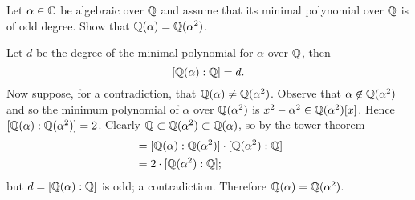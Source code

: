 \documentclass[a4paper, answers]{exam}
\begin{document}
\begin{questions}
	\question
		Let $\alpha \in \mathbb{C}$ be algebraic over $\mathbb{Q}$ and assume that its
		minimal polynomial over $\mathbb{Q}$ is of odd degree.
		Show that $\mathbb{Q}(\alpha) = \mathbb{Q}(\alpha^2)$.
		\begin{solution}
			Let $d$ be the degree of the minimal polynomial for $\alpha$ over
			$\mathbb{Q}$, then
			\[
				[\mathbb{Q}(\alpha): \mathbb{Q}] = d.
			\]
			Now suppose, for a contradiction, that 
			$\mathbb{Q}(\alpha) \neq \mathbb{Q}(\alpha^2)$.
			Observe that $\alpha \not\in \mathbb{Q}(\alpha^2)$ and so the minimum
			polynomial of $\alpha$ over $\mathbb{Q}(\alpha^2)$ is 
			$x^2 - \alpha^2 \in \mathbb{Q}(\alpha^2)[x]$.
			Hence $[\mathbb{Q}(\alpha): \mathbb{Q}(\alpha^2)] = 2$.
			Clearly $\mathbb{Q} \subset \mathbb{Q}(\alpha^2) \subset \mathbb{Q}(\alpha)$, so by the
			tower theorem
			\begin{align*}
				[\Q(\alpha): \Q]
					&= [\Q(\alpha): \Q(\alpha^2)] \cdot
					[\Q(\alpha^2): \Q] \\
					&= 2 \cdot [\Q(\alpha^2): \Q];
			\end{align*}
			but $d = [\mathbb{Q}(\alpha): \mathbb{Q}]$ is odd; a contradiction.
			Therefore $\mathbb{Q}(\alpha) = \mathbb{Q}(\alpha^2)$.
		\end{solution}
\end{questions}
\end{document}
